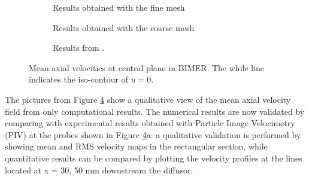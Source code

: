 \begin{figure}[ht]
\centering
\begin{subfigure}[b]{0.4\textwidth}
	\centering
   \caption{Results obtained with the fine mesh}
   \label{fig:field_axial_velocity_mean_fine}
\end{subfigure}
\hspace{0.8in}
\begin{subfigure}[b]{0.4\textwidth}
	\centering
   \caption{Results obtained with the coarse mesh}
   \label{fig:field_axial_velocity_mean_coarse}
\end{subfigure}
\begin{subfigure}[b]{1.0\textwidth}
	\centering
   \caption{Results from .}
   \label{fig:field_axial_velocity_mean_cheneau} 
\end{subfigure}
\caption[Mean axial velocities at central plane in BIMER]{Mean axial velocities at central plane in BIMER. The while line indicates the iso-contour of $\overline{u} = 0$.}
\label{fig:BIMER_mean_axial_velocities}
\end{figure}


\clearpage
 
The pictures from Figure \ref{fig:BIMER_mean_axial_velocities} show a qualitative view of the mean axial velocity field from only computational results. The numerical results are now validated by comparing with experimental results obtained with Particle Image Velocimetry (PIV) at the probes shown in Figure \ref{fig:BIMER_mean_axial_velocities}a: a qualitative validation is performed by showing mean and RMS velocity maps in the rectangular section, while quantitative results can be compared by plotting the velocity profiles at the lines located at x = 30, 50 mm downstream the diffusor.




